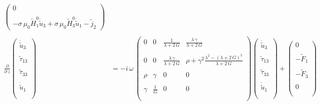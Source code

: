 \begin{align}
\begin{pmatrix}
0\\\\
-\sigma\,\mu_0\tilde{H}_1^0\dot{\tilde{u}}_3+\sigma\,\mu_0\tilde{H}_3^0\dot{\tilde{u}}_1 
-\tilde{j}_2
\end{pmatrix}\\\nonumber\\\label{eq.matricial_3}
\frac{\partial}{\partial\,z}
\begin{pmatrix}
\dot{\tilde{u}}_3\\\\
\tilde{\tau}_{13}\\\\
\tilde{\tau}_{33}\\\\
\dot{\tilde{u}}_1\\\\
\end{pmatrix}
&=-i\,\omega\,
\begin{pmatrix}
0&0&\frac{1}{\lambda+2\,G}&\frac{\lambda\,\gamma}{\lambda+2\,G}\\\\
0&0&\frac{\lambda\,\gamma}{\lambda+2\,G}&\rho+\gamma^2\frac{\lambda^2-(\lambda+2\,G)^2}{\lambda+2\,G}\\\\
\rho&\gamma&0&0\\\\
\gamma&\frac{1}{G}&0&0\\\\
\end{pmatrix}
\begin{pmatrix}
\dot{\tilde{u}}_3\\\\
\tilde{\tau}_{13}\\\\
\tilde{\tau}_{33}\\\\
\dot{\tilde{u}}_1\\\\
\end{pmatrix}
+
\begin{pmatrix}
0\\\\
-\tilde{F}_1\\\\
-\tilde{F}_3\\\\
0\\\\
\end{pmatrix}\\\nonumber\\\label{eq.matricial_4}

\end{align}
